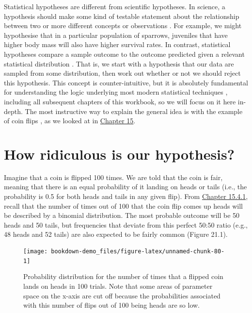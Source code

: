 \documentclass[
  openany]{krantz}
\begin{document}
Statistical hypotheses are different from scientific hypotheses.
In science, a hypothesis should make some kind of testable statement about the relationship between two or more different concepts or observations \citep{Bouma2000}.
For example, we might hypothesise that in a particular population of sparrows, juveniles that have higher body mass will also have higher survival rates.
In contrast, statistical hypotheses compare a sample outcome to the outcome predicted given a relevant statistical distribution \citep{Sokal1995}.
That is, we start with a hypothesis that our data are sampled from some distribution, then work out whether or not we should reject this hypothesis.
This concept is counter-intuitive, but it is absolutely fundamental for understanding the logic underlying most modern statistical techniques \citep{Sokal1995, Mayo1996, Greenland2016}, including all subsequent chapters of this workbook, so we will focus on it here in-depth.
The most instructive way to explain the general idea is with the example of coin flips \citep{Mayo1996}, as we looked at in \protect\hyperlink{Chapter_15}{Chapter 15}.

\hypertarget{how-ridiculous-is-our-hypothesis}{%
\section{How ridiculous is our hypothesis?}\label{how-ridiculous-is-our-hypothesis}}

Imagine that a coin is flipped 100 times.
We are told that the coin is fair, meaning that there is an equal probability of it landing on heads or tails (i.e., the probability is 0.5 for both heads and tails in any given flip).
From \protect\hyperlink{Chapter_15.htmlux5cux23binomial-distribution}{Chapter 15.4.1}, recall that the number of times out of 100 that the coin flip comes up heads will be described by a binomial distribution.
The most probable outcome will be 50 heads and 50 tails, but frequencies that deviate from this perfect 50:50 ratio (e.g., 48 heads and 52 tails) are also expected to be fairly common (Figure 21.1).

\begin{figure}
\texttt{[image: bookdown-demo\_files/figure-latex/unnamed-chunk-80-1]} \caption{Probability distribution for the number of times that a flipped coin lands on heads in 100 trials. Note that some areas of parameter space on the x-axis are cut off because the probabilities associated with this number of flips out of 100 being heads are so low.}\label{fig:unnamed-chunk-80}
\end{figure}
\end{document}
